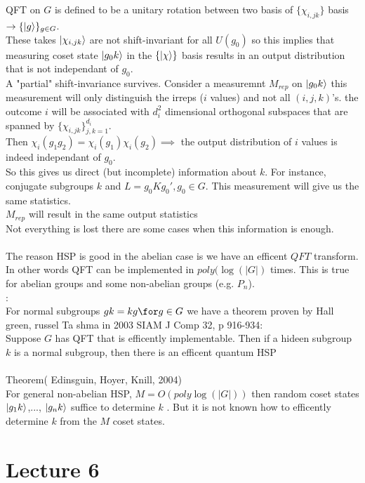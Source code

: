 \documentclass{article}
\begin{document}
QFT on $G$ is defined to be a unitary rotation between two basis of $\{ \chi_{i,jk} \}$ basis $\rightarrow \{ \ket{g} \}_{g \in G}$.\\
These takes $\ket{\chi_{i,jk}}$ are not shift-invariant for all $U(g_0)$ so this implies that measuring coset state $\ket{g_0 k}$ in the $\{ \ket{\chi}\}$ basis results in an output distribution that is not independant of $g_0$.\\
A "partial" shift-invariance survives. Consider a measuremnt $M_{rep}$ on $\ket{g_0 k}$ this measurement will only distinguish the irreps ($i$ values) and not all $(i,j,k)$'s. the outcome $i$ will be associated with $d_i^2$ dimensional orthogonal subspaces that are spanned by $\{\chi_{i,jk}\}_{j,k = 1}^{d_i}$.\\
Then $\chi_i(g_1 g_2) = \chi_i(g_1) \chi_i(g_2) \implies$ the output distribution of $i$ values is indeed independant of $g_0$.\\
So this gives us direct (but incomplete) information about $k$. For instance, conjugate subgroups $k$ and $L = g_0 K g_0', g_0 \in G$. This measurement will give us the same statistics.\\
$M_{rep}$ will result in the same output statistics\\
Not everything is lost there are some cases when this information is enough.\\\\
The reason HSP is good in the abelian case is we have an efficent $QFT$ transform. In other words QFT can be implemented in $poly(\log(|G|)$ times. This is true for abelian groups and some non-abelian groups (e.g. $P_n$).\\
:\\
For normal subgroups $gk = kg \for g \in G$ we have a theorem proven by Hall green, russel Ta shma in 2003 SIAM J Comp 32, p 916-934:\\
Suppose $G$ has QFT that is efficently implementable. Then if a hideen subgroup $k$ is a normal subgroup, then there is an efficent quantum HSP\\\\
Theorem( Edinsguin, Hoyer, Knill, 2004)\\
For general non-abelian HSP, $M = O(poly \log(|G|))$ then random coset states $\ket{g_1k}$,..., $\ket{g_nk}$ suffice to determine $k$ . But it is not known how to efficently determine $k$ from the $M$ coset states.
\section{Lecture 6}
\end{document}

